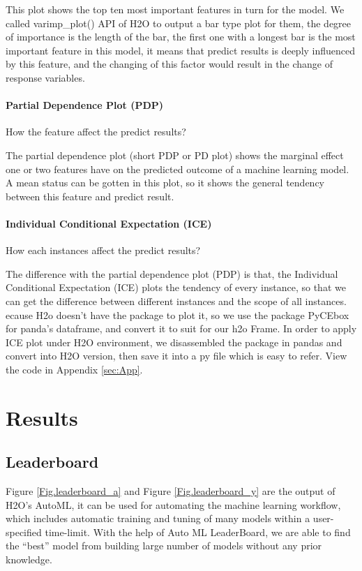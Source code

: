 \documentclass{article}
\begin{document}
This plot shows the top ten most important features in turn for the model. We called varimp\_plot() API of H2O to output a bar type plot  for them, the degree of importance is the length of the bar, the first one with a longest bar is the most important feature in this model, it means that predict results is deeply influenced by this feature, and the changing of this factor would result in the change of response variables.
\paragraph{Partial Dependence Plot (PDP)}
How the feature affect the predict results?

The partial dependence plot (short PDP or PD plot) shows the marginal effect one or two features have on the predicted outcome of a machine learning model\cite{pdp}. A mean status can be gotten in this plot, so it shows the general tendency between this feature and predict result.
\paragraph{Individual Conditional Expectation (ICE)}
How each instances affect the predict results?

The difference with the partial dependence plot (PDP) is that, the Individual Conditional Expectation (ICE) plots the tendency of every instance, so that we can get the difference between different instances and the scope of all instances. ecause H2o doesn’t have the package to plot it, so we use the package PyCEbox for panda’s dataframe, and convert it to suit for our h2o Frame.
In order to apply ICE plot under H2O environment, we disassembled the package in pandas and convert into H2O version, then save it into a py file which is easy to refer. View the code in Appendix \ref{sec:App}. 
\section{Results}

\subsection{Leaderboard}
Figure \ref{Fig.leaderboard_a} and Figure \ref{Fig.leaderboard_y} are the output of H2O’s AutoML, it can be used for automating the machine learning workflow, which includes automatic training and tuning of many models within a user-specified time-limit. With the help of Auto ML LeaderBoard, we are able to find the “best” model from building large number of models without any prior knowledge\cite{AutoML}.
\end{document}
